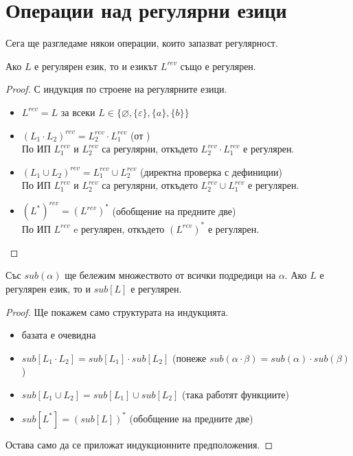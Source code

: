 \section{Операции над регулярни езици}

Сега ще разгледаме някои операции, които запазват регулярност.

\begin{claim}
    Ако $L$ е регулярен език, то и езикът $L^{rev}$ също е регулярен.
\end{claim}

\begin{proof}
    С индукция по строене на регулярните езици.

    \begin{itemize}
        \item $L^{rev} = L$ за всеки $L \in \{ \varnothing, \{ \varepsilon \}, \{ a \}, \{ b \} \}$ \checkmark
        \item $(L_1 \cdot L_2)^{rev} = L_2^{rev} \cdot L_1^{rev}$ (от ) \\
              По ИП $L_1^{rev}$ и $L_2^{rev}$ са регулярни, откъдето $L_2^{rev} \cdot L_1^{rev}$ е регулярен.
        \item $(L_1 \cup L_2)^{rev} = L_1^{rev} \cup L_2^{rev}$ (директна проверка с дефиниции) \\
              По ИП $L_1^{rev}$ и $L_2^{rev}$ са регулярни, откъдето $L_2^{rev} \cup L_1^{rev}$ е регулярен.
        \item $(L^*)^{rev} = (L^{rev})^*$ (обобщение на предните две) \\
              По ИП $L^{rev}$ e регулярен, откъдето $(L^{rev})^*$ е регулярен.
    \end{itemize}
\end{proof}

\begin{claim}
    Със $sub(\alpha)$ ще бележим множеството от всички подредици на $\alpha$.
    Ако $L$ е регулярен език, то и $sub[L]$ е регулярен.
\end{claim}

\begin{proof}
    Ще покажем само структурата на индукцията.

    \begin{itemize}
        \item базата е очевидна \checkmark
        \item $sub[L_1 \cdot L_2] = sub[L_1] \cdot sub[L_2]$ (понеже $sub(\alpha \cdot \beta) = sub(\alpha) \cdot sub(\beta)$)
        \item $sub[L_1 \cup L_2] = sub[L_1] \cup sub[L_2]$ (така работят функциите)
        \item $sub[L^*] = (sub[L])^*$ (обобщение на предните две)
    \end{itemize}

    Остава само да се приложат индукционните предположения.
\end{proof}